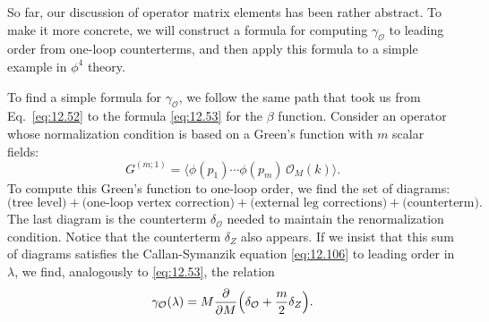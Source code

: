 So far, our discussion of operator matrix elements has been rather abstract.
To make it more concrete, we will construct a formula for computing
$\gamma_{\mathcal{O}}$ to leading order from one-loop counterterms, and then
apply this formula to a simple example in $\phi^4$ theory.

To find a simple formula for $\gamma_{\mathcal{O}}$, we follow the same path
that took us from Eq.~\eqref{eq:12.52} to the formula \eqref{eq:12.53} for
the $\beta$ function.  Consider an operator whose normalization condition is
based on a Green's function with $m$ scalar fields:
\begin{equation}
  G^{(m;1)} = \bigl\langle \phi(p_1)\cdots\phi(p_m)\,\mathcal{O}_M(k)
    \bigr\rangle .
  \label{eq:12.111}
\end{equation}
To compute this Green's function to one-loop order, we find the set of
diagrams:
\begin{equation}
  \text{(tree level)} + \text{(one-loop vertex correction)} + \text{(external
    leg corrections)} + \text{(counterterm)} .
\end{equation}
The last diagram is the counterterm $\delta_{\mathcal{O}}$ needed to maintain
the renormalization condition.  Notice that the counterterm $\delta_Z$ also
appears.  If we insist that this sum of diagrams satisfies the Callan-Symanzik
equation \eqref{eq:12.106} to leading order in $\lambda$, we find,
analogously to \eqref{eq:12.53}, the relation
\begin{equation}
  \gamma_{\mathcal{O}}(\lambda) = M\frac{\partial}{\partial M}\Bigl(
    \delta_{\mathcal{O}} + \frac{m}{2}\delta_Z \Bigr) .
  \label{eq:12.112}
\end{equation}

